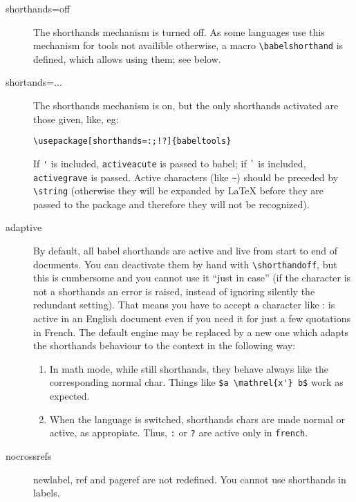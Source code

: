\documentclass{article}
\begin{document}
\begin{description}
\item[shorthands=off] The shorthands mechanism is turned off.
As some languages use this mechanism for tools not availible
otherwise, a macro \verb|\babelshorthand| is defined, which allows 
using them; see below. 

\item[shortands=...]  The shorthands mechanism is on, but the only
shorthands activated are those given, like, eg:
\begin{verbatim}
\usepackage[shorthands=:;!?]{babeltools}
\end{verbatim} 

If \verb|'| is included, \texttt{activeacute} is passed to
\textsf{babel}; if \verb|`| is included, \texttt{activegrave} is
passed.  Active characters (like \verb|~|) should be preceded by
\verb|\string| (otherwise they will be expanded by \LaTeX{} before
they are passed to the package and therefore they will not be
recognized).

\item[adaptive] By default, all \textsf{babel} shorthands are active
and live from start to end of documents.  You can deactivate them by
hand with \verb|\shorthandoff|, but this is cumbersome and you cannot
use it ``just in case'' (if the character is not a shorthands an error
is raised, instead of ignoring silently the redundant setting).  That
means you have to accept a character like : is active in an English
document even if you need it for just a few quotations in French.  The
default engine may be replaced by a new one which adapts the
shorthands behaviour to the context in the following way:
\begin{enumerate}
\item In math mode, while still shorthands, they behave always like the
corresponding normal char.  Things like \verb|$a \mathrel{x'} b$|
work as expected.

\item When the language is switched, shorthands chars are made normal or
active, as appropiate.  Thus, \texttt{:} or \texttt{?}  are active only in
\texttt{french}.
\end{enumerate}


\item[nocrossrefs] newlabel, ref and pageref are not redefined. You 
cannot use shorthands in labels.


\end{description}
\end{document}

